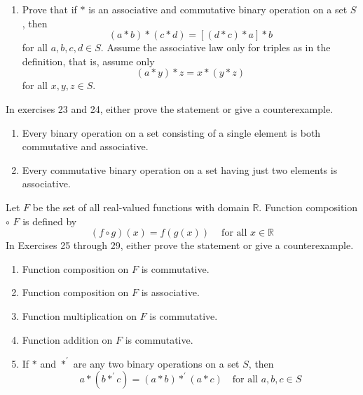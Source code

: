 \documentclass[10pt,letterpaper]{article}
\begin{document}
  \begin{enumerate}[resume]
    \item Prove that if $*$ is an associative and commutative binary operation on a set $S$, then 
    \[ (a\ast b)\ast (c \ast d)=[(d \ast c) \ast a] \ast b \] 
    for all $a, b,c,d \in S$. Assume the associative law only for triples as in the definition,
    that is, assume only \[ (a * y)*z= x*(y*z) \] for all $x, y,z \in S$.
  \end{enumerate}

  \noindent In exercises 23 and 24, either prove the statement or give a counterexample.
  \begin{enumerate}[resume]
    \item Every binary operation on a set consisting of a single element is both commutative and associative.
    \item Every commutative binary operation on a set having just two elements is associative.
  \end{enumerate}

  \noindent Let $F$ be the set of all real-valued functions with domain $\mathbb{R}$. Function composition $\circ$
  $F$ is defined by \[ (f \circ g)(x) = f(g(x)) \ \ \ \ \text{ for all \ \ $x \in \mathbb{R}$}  \] 
  In Exercises 25 through 29, either prove the statement or give a counterexample.
  \begin{enumerate}[resume]
    \item Function composition on $F$ is commutative.
    \item Function composition on $F$ is associative.
    \item Function multiplication on $F$ is commutative.
    \item Function addition on $F$ is commutative.
    \item If $*$ and $*^{\prime}$ are any two binary operations on a set $S$, then
    \[ a*(b*^{\prime} c) = (a*b) *^{\prime} (a*c) \ \ \  \text{ for all $a, b, c \in S$}\]
  \end{enumerate}
\end{document}
